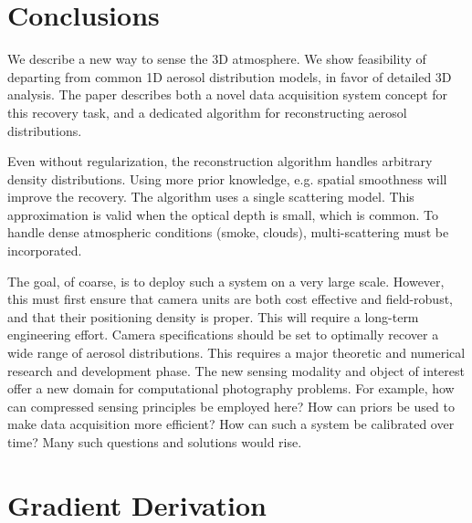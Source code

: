 \documentclass[10pt,letterpaper]{article}
\begin{document}

\section{Conclusions}
\label{sec:conclusions}

We describe a new way to sense the 3D atmosphere. We show feasibility
of departing from common 1D aerosol distribution models, in favor of
detailed 3D analysis.  The paper describes both a novel data
acquisition system concept for this recovery task, and a dedicated
algorithm for reconstructing aerosol distributions.

Even without regularization, the reconstruction algorithm handles
arbitrary density distributions. Using more prior knowledge,
e.g. spatial smoothness will improve the recovery.  The algorithm uses
a single scattering model. This approximation is valid when the
optical depth is small, which is common. To handle dense atmospheric
conditions (smoke, clouds), multi-scattering must be incorporated.

The goal, of coarse, is to deploy such a system on a very large
scale. However, this must first ensure that camera units are both cost
effective and field-robust, and that their positioning density is
proper. This will require a long-term engineering effort. Camera
specifications should be set to optimally recover a wide range of
aerosol distributions. This requires a major theoretic and numerical
research and development phase.  The new sensing modality and object
of interest offer a new domain for computational photography
problems. For example, how can compressed sensing principles be
employed here? How can priors be used to make data acquisition more
efficient? How can such a system be calibrated over time? Many such
questions and solutions would rise.


\appendix


\section{Gradient Derivation}
\label{sec:gradient-derivation}
\end{document}
